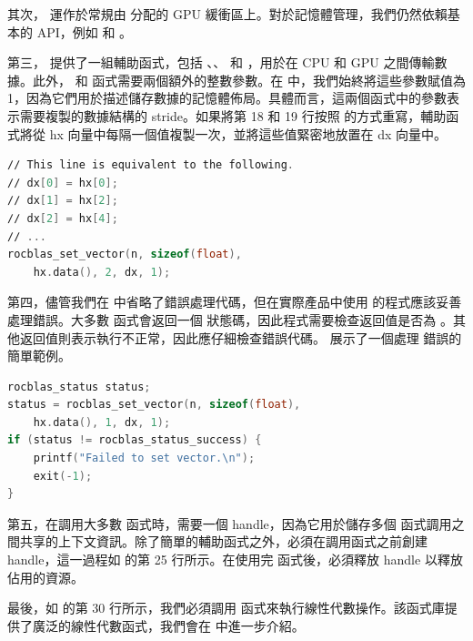 其次， 運作於常規由  分配的 GPU 緩衝區上。對於記憶體管理，我們仍然依賴基本的  API，例如  和 。

第三， 提供了一組輔助函式，包括 、、 和 ，用於在 CPU 和 GPU 之間傳輸數據。此外， 和  函式需要兩個額外的整數參數。在  中，我們始終將這些參數賦值為 1，因為它們用於描述儲存數據的記憶體佈局。具體而言，這兩個函式中的參數表示需要複製的數據結構的 stride。如果將第 18 和 19 行按照  的方式重寫，輔助函式將從 hx 向量中每隔一個值複製一次，並將這些值緊密地放置在 dx 向量中。

\begin{lstlisting}[language=C, caption={使用不同值的範例。}, captionpos=t, label={lst:different}]
∕∕ This line is equivalent to the following.
∕∕ dx[0] = hx[0];
∕∕ dx[1] = hx[2];
∕∕ dx[2] = hx[4];
∕∕ ...
rocblas_set_vector(n, sizeof(float),
    hx.data(), 2, dx, 1);
\end{lstlisting}

第四，儘管我們在  中省略了錯誤處理代碼，但在實際產品中使用  的程式應該妥善處理錯誤。大多數  函式會返回一個  狀態碼，因此程式需要檢查返回值是否為 。其他返回值則表示執行不正常，因此應仔細檢查錯誤代碼。 展示了一個處理  錯誤的簡單範例。

\begin{lstlisting}[language=C, caption={處理 \term{rocBLAS} API 錯誤的範例。}, captionpos=t, label={lst:APIerror}]
rocblas_status status;
status = rocblas_set_vector(n, sizeof(float),
    hx.data(), 1, dx, 1);
if (status != rocblas_status_success) {
    printf("Failed to set vector.\n");
    exit(-1);
}
\end{lstlisting}

第五，在調用大多數  函式時，需要一個 handle，因為它用於儲存多個  函式調用之間共享的上下文資訊。除了簡單的輔助函式之外，必須在調用函式之前創建 handle，這一過程如  的第 25 行所示。在使用完  函式後，必須釋放 handle 以釋放佔用的資源。

最後，如  的第 30 行所示，我們必須調用  函式來執行線性代數操作。該函式庫提供了廣泛的線性代數函式，我們會在  中進一步介紹。

